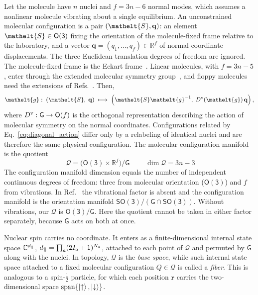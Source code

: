 \documentclass[
  reprint,
  aps,
  prx,
  superscriptaddress,
  amsmath,
  amssymb,
  longbibliography
]{revtex4-2}
\newcommand{\eltfont}[1]{{\let\sigma\eltsigma\mathelt{#1}}}
\newcommand{\grp}[1]{\mathsf{#1}}
\newcommand{\elt}[1]{\eltfont{#1}}
\newcommand{\gel}{\elt{g}}             %
\newcommand{\orient}{\elt{S}}          %
\newcommand{\spin}{\mathrel{\upharpoonleft}\kern-2pt\mathrel{\downharpoonright}}
\providecommand{\spin}{\mathrel{\upharpoonleft}\kern-2pt\mathrel{\downharpoonright}}
\providecommand{\Real}{\mathbb R}
\providecommand{\Othree}{\grp{O(3)}}
\providecommand{\SOthree}{\grp{SO(3)}}
\begin{document}
Let the molecule have $n$ nuclei and $f = 3n-6$ normal modes, which assumes a nonlinear molecule vibrating about a single equilibrium. An unconstrained molecular configuration is a pair $(\orient,\mathbf q)$: an element $\orient\in\Othree$ fixing the orientation of the molecule-fixed frame relative to the laboratory, and a vector $\mathbf q=(q_1,\ldots,q_f)\in\Real^{f}$ of normal-coordinate displacements. The three Euclidean translation degrees of freedom are ignored. The molecule-fixed frame is the Eckart frame~\cite{Eckart1935, LouckGalbraith1976, LittlejohnReinsch1997}. Linear molecules, with $f=3n-5$, enter through the extended molecular symmetry group~\cite{BunkerJensen2006}, and floppy molecules need the extensions of Refs.~\cite{Schmiedt2015, Fabri2017}. Then,
\begin{equation}
    \gel:\;(\orient,\;\mathbf q)\;\longmapsto\;\left(\orient\gel^{-1},\;D^{\mathrm{v}}(\gel)\,\mathbf q\right),
    \label{eq:diagonal_action}
\end{equation}
where $D^{\mathrm{v}}:\grp{G}\to\grp{O(\mathnormal{f})}$ is the orthogonal representation describing the action of molecular symmetry on the normal coordinates. Configurations related by Eq.~\eqref{eq:diagonal_action} differ only by a relabeling of identical nuclei and are therefore the same physical configuration. The molecular configuration manifold is the quotient
\begin{equation}
\boxed{\;
\mathcal Q
=
\Big(\Othree\times\Real^{f}\Big)\Big/\grp{G}
\;}
\qquad
\dim\mathcal Q = 3n-3
\label{eq:config_manifold}
\end{equation}
The configuration manifold dimension equals the number of independent continuous degrees of freedom: three from molecular orientation ($\Othree$) and $f$ from vibrations. 
In Ref.~\cite{albert2025quantumtheorymolecularorientations} the vibrational factor is absent and the configuration manifold is the orientation manifold $\SOthree/(\grp{G}\cap\grp{SO(3)})$. Without vibrations, our $\mathcal Q$ is $\Othree/\grp{G}$. 
Here the quotient cannot be taken in either factor separately, because $\grp{G}$ acts on both at once. 


Nuclear spin carries no coordinate. It enters as a finite-dimensional internal state space $\mathbb C^{d_{\spin}}$, $d_{\spin}=\prod_a(2I_a+1)^{N_a}$, attached to each point of $\mathcal Q$ and permuted by $\grp{G}$ along with the nuclei. In topology, \(\mathcal Q\) is the \emph{base space}, while such internal state space attached to a fixed molecular configuration \(Q\in\mathcal Q\) is called a \emph{fiber}. This is analogous to a spin-\(\tfrac12\) particle, for which each position \(\mathbf r\) carries the two-dimensional space \(\operatorname{span}\{\ket{\uparrow},\ket{\downarrow}\}\).
\end{document}
